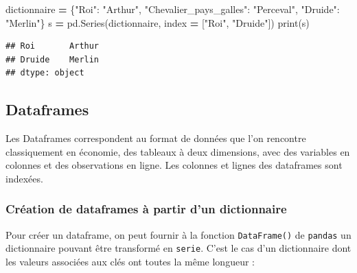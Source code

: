 \documentclass[
  12pt,
]{book}
\newenvironment{Shaded}{\begin{snugshade}}{\end{snugshade}}
\newcommand{\BuiltInTok}[1]{#1}
\newcommand{\NormalTok}[1]{#1}
\newcommand{\OperatorTok}[1]{\textcolor[rgb]{0.81,0.36,0.00}{\textbf{#1}}}
\newcommand{\StringTok}[1]{\textcolor[rgb]{0.31,0.60,0.02}{#1}}
\numberwithin{equation}{section}
\numberwithin{countremarque}{section}
\begin{document}
\begin{Shaded}
\begin{Highlighting}[]
\NormalTok{dictionnaire }\OperatorTok{=}\NormalTok{ \{}\StringTok{"Roi"}\NormalTok{: }\StringTok{"Arthur"}\NormalTok{,}
                \StringTok{"Chevalier\_pays\_galles"}\NormalTok{: }\StringTok{"Perceval"}\NormalTok{,}
                \StringTok{"Druide"}\NormalTok{: }\StringTok{"Merlin"}\NormalTok{\}}
\NormalTok{s }\OperatorTok{=}\NormalTok{ pd.Series(dictionnaire, index }\OperatorTok{=}\NormalTok{ [}\StringTok{"Roi"}\NormalTok{, }\StringTok{"Druide"}\NormalTok{])}
\BuiltInTok{print}\NormalTok{(s)}
\end{Highlighting}
\end{Shaded}

\begin{lstlisting}
## Roi       Arthur
## Druide    Merlin
## dtype: object
\end{lstlisting}

\subsection{Dataframes}\label{dataframes}

Les Dataframes correspondent au format de données que l'on rencontre classiquement en économie, des tableaux à deux dimensions, avec des variables en colonnes et des observations en ligne. Les colonnes et lignes des dataframes sont indexées.

\subsubsection{Création de dataframes à partir d'un dictionnaire}\label{cruxe9ation-de-dataframes-uxe0-partir-dun-dictionnaire}

Pour créer un dataframe, on peut fournir à la fonction \texttt{DataFrame()} de \texttt{pandas} un dictionnaire pouvant être transformé en \texttt{serie}. C'est le cas d'un dictionnaire dont les valeurs associées aux clés ont toutes la même longueur :
\end{document}
